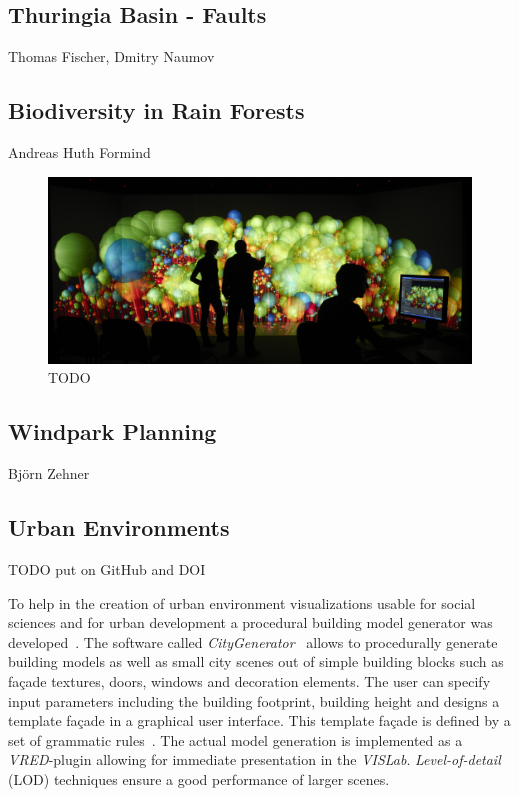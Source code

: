 \documentclass[twocolumn]{svjour3}          %
\begin{document}
\subsection{Thuringia Basin - Faults}
\label{thuringia-basin---faults}

Thomas Fischer, Dmitry Naumov

\subsection{Biodiversity in Rain Forests}
\label{biodiversity-in-rain-forests}

Andreas Huth Formind \cite{kohler:98}

\begin{figure}
  \includegraphics[width=\linewidth]{images/biodiversity.jpg}
\caption{TODO}
\label{fig:biodiversity}
\end{figure}

\subsection{Windpark Planning}
\label{windpark-planning}

Bj\"orn Zehner \cite{zehner:windpark}

\subsection{Urban Environments}
\label{urban-environments}

TODO put on GitHub and DOI

To help in the creation of urban environment visualizations usable for social sciences and for urban development a procedural building model generator was developed~\cite{bilke:master,procedural:modelling}. The software called \emph{CityGenerator}~\cite{bilke:citygenerator} allows to procedurally generate building models as well as small city scenes out of simple building blocks such as fa\c{c}ade textures, doors, windows and decoration elements. The user can specify input parameters including the building footprint, building height and designs a template fa\c{c}ade in a graphical user interface. This template fa\c{c}ade is defined by a set of grammatic rules~\cite{procedural:buildings}. The actual model generation is implemented as a \emph{VRED}-plugin allowing for immediate presentation in the \emph{VISLab}. \emph{Level-of-detail} (LOD) techniques ensure a good performance of larger scenes.
\end{document}
